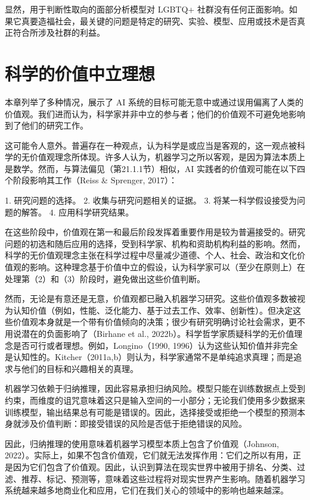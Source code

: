 显然，用于判断性取向的面部分析模型对 LGBTQ+ 社群没有任何正面影响。如果它真要造福社会，最关键的问题是特定的研究、实验、模型、应用或技术是否真正符合所涉及社群的利益。

\section{科学的价值中立理想}
本章列举了多种情况，展示了 AI 系统的目标可能无意中或通过误用偏离了人类的价值观。我们进而认为，科学家并非中立的参与者；他们的价值观不可避免地影响到了他们的研究工作。

这可能令人意外。普遍存在一种观点，认为科学是或应当是客观的，这一观点被科学的无价值观理念所体现。许多人认为，机器学习之所以客观，是因为算法本质上是数学。然而，与算法偏见（第21.1.1节）相似，AI 实践者的价值观可能在以下四个阶段影响其工作（Reiss \& Sprenger, 2017）：

1. 研究问题的选择。
2. 收集与研究问题相关的证据。
3. 将某一科学假设接受为问题的解答。
4. 应用科学研究结果。

在这些阶段中，价值观在第一和最后阶段发挥着重要作用是较为普遍接受的。研究问题的初选和随后应用的选择，受到科学家、机构和资助机构利益的影响。然而，科学的无价值观理念主张在科学过程中尽量减少道德、个人、社会、政治和文化价值观的影响。这种理念基于价值中立的假设，认为科学家可以（至少在原则上）在处理第（2）和（3）阶段时，避免做出这些价值判断。

然而，无论是有意还是无意，价值观都已融入机器学习研究。这些价值观多数被视为认知价值（例如，性能、泛化能力、基于过去工作、效率、创新性）。但决定这些价值观本身就是一个带有价值倾向的决策；很少有研究明确讨论社会需求，更不用说潜在的负面影响了（Birhane et al., 2022b）。科学哲学家质疑科学的无价值理念是否可行或者理想。例如，Longino（1990, 1996）认为这些认知价值并非完全是认知性的。Kitcher（2011a,b）则认为，科学家通常不是单纯追求真理；而是追求与他们的目标和兴趣相关的真理。

机器学习依赖于归纳推理，因此容易承担归纳风险。模型只能在训练数据点上受到约束，而维度的诅咒意味着这只是输入空间的一小部分；无论我们使用多少数据来训练模型，输出结果总有可能是错误的。因此，选择接受或拒绝一个模型的预测本身就涉及价值判断：即接受错误的风险是否低于拒绝错误的风险。

因此，归纳推理的使用意味着机器学习模型本质上包含了价值观（Johnson, 2022）。实际上，如果不包含价值观，它们就无法发挥作用：它们之所以有用，正是因为它们包含了价值观。因此，认识到算法在现实世界中被用于排名、分类、过滤、推荐、标记、预测等，意味着这些过程将对现实世界产生影响。随着机器学习系统越来越多地商业化和应用，它们在我们关心的领域中的影响也越来越深。

